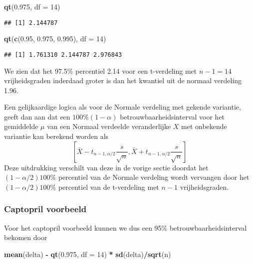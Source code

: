 \documentclass[
  12pt,dutch,coursenotes]{book}
\newenvironment{Shaded}{\begin{snugshade}}{\end{snugshade}}
\newcommand{\DataTypeTok}[1]{\textcolor[rgb]{0.13,0.29,0.53}{#1}}
\newcommand{\DecValTok}[1]{\textcolor[rgb]{0.00,0.00,0.81}{#1}}
\newcommand{\FloatTok}[1]{\textcolor[rgb]{0.00,0.00,0.81}{#1}}
\newcommand{\KeywordTok}[1]{\textcolor[rgb]{0.13,0.29,0.53}{\textbf{#1}}}
\newcommand{\NormalTok}[1]{#1}
\newcommand{\OperatorTok}[1]{\textcolor[rgb]{0.81,0.36,0.00}{\textbf{#1}}}
\newcommand{\StringTok}[1]{\textcolor[rgb]{0.31,0.60,0.02}{#1}}
\theoremstyle{definition}
\theoremstyle{definition}
\theoremstyle{definition}
\theoremstyle{remark}
\begin{document}
\begin{Shaded}
\begin{Highlighting}[]
\KeywordTok{qt}\NormalTok{(}\FloatTok{0.975}\NormalTok{, }\DataTypeTok{df =} \DecValTok{14}\NormalTok{)}
\end{Highlighting}
\end{Shaded}

\begin{verbatim}
## [1] 2.144787
\end{verbatim}

\begin{Shaded}
\begin{Highlighting}[]
\KeywordTok{qt}\NormalTok{(}\KeywordTok{c}\NormalTok{(}\FloatTok{0.95}\NormalTok{, }\FloatTok{0.975}\NormalTok{, }\FloatTok{0.995}\NormalTok{), }\DataTypeTok{df =} \DecValTok{14}\NormalTok{)}
\end{Highlighting}
\end{Shaded}

\begin{verbatim}
## [1] 1.761310 2.144787 2.976843
\end{verbatim}

We zien dat het 97.5\% percentiel 2.14 voor een t-verdeling met \(n-1=14\) vrijheidsgraden inderdaad groter is dan het kwantiel uit de normaal verdeling 1.96.

Een gelijkaardige logica als voor de Normale verdeling met gekende variantie, geeft dan aan dat een \(100\% (1-\alpha)\) betrouwbaarheidsinterval voor het gemiddelde \(\mu\) van een
Normaal verdeelde veranderlijke \(X\) met onbekende variantie kan berekend
worden als
\begin{equation*}
\left[\bar{X} - t_{n-1, \alpha/2} \frac{s}{\sqrt{n}} , \bar{X} + t_{n-1,
\alpha/2} \frac{s}{\sqrt{n}}\right]
\end{equation*}
Deze uitdrukking verschilt van deze in de vorige sectie doordat het \((1-\alpha/2)100\%\) percentiel van de Normale verdeling wordt vervangen door
het \((1-\alpha/2)100\%\) percentiel van de t-verdeling met \(n-1\)
vrijheidsgraden.

\hypertarget{captopril-voorbeeld-1}{%
\subsubsection{Captopril voorbeeld}\label{captopril-voorbeeld-1}}

Voor het captopril voorbeeld kunnen we dus een 95\% betrouwbaarheidsinterval bekomen door

\begin{Shaded}
\begin{Highlighting}[]
\KeywordTok{mean}\NormalTok{(delta) }\OperatorTok{{-}}\StringTok{ }\KeywordTok{qt}\NormalTok{(}\FloatTok{0.975}\NormalTok{, }\DataTypeTok{df =} \DecValTok{14}\NormalTok{) }\OperatorTok{*}\StringTok{ }\KeywordTok{sd}\NormalTok{(delta)}\OperatorTok{/}\KeywordTok{sqrt}\NormalTok{(n)}
\end{Highlighting}
\end{Shaded}
\end{document}

